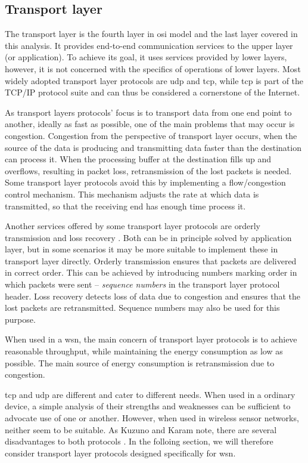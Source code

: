 \subsection{Transport layer}
The transport layer is the fourth layer in \acrshort{osi} model and the last layer covered in this analysis. It provides end-to-end communication services to the upper layer (or application)\cite{Braden1989RequirementsLayers}. To achieve its goal, it uses services provided by lower layers, however, it is not concerned with the specifics of operations of lower layers. Most widely adopted transport layer protocols are \acrshort{udp} and \acrshort{tcp}, while \acrshort{tcp} is part of the TCP/IP protocol suite and can thus be considered a cornerstone of the Internet.

As transport layers protocols' focus is to transport data from one end point to another, ideally as fast as possible, one of the main problems that may occur is congestion. Congestion from the perspective of transport layer occurs, when the source of the data is producing and transmitting data faster than the destination can process it. When the processing buffer at the destination fills up and overflows, resulting in packet loss, retransmission of the lost packets is needed. Some transport layer protocols avoid this by implementing a flow/congestion control mechanism. This mechanism adjusts the rate at which data is transmitted, so that the receiving end has enough time process it.

Another services offered by some transport layer protocols are orderly transmission and loss recovery \cite{Kuzuno2017BlockchainBitcoin}. Both can be in principle solved by application layer, but in some scenarios it may be more suitable to implement these in transport layer directly. Orderly transmission ensures that packets are delivered in correct order. This can be achieved by introducing numbers marking order in which packets were sent -- \textit{sequence numbers} in the transport layer protocol header. Loss recovery detects loss of data due to congestion and ensures that the lost packets are retransmitted. Sequence numbers may also be used for this purpose.

When used in a \acrshort{wsn}, the main concern of transport layer protocols is to achieve reasonable throughput, while maintaining the energy consumption as low as possible. The main source of energy consumption is retransmission due to congestion.

\acrshort{tcp} and \acrshort{udp} are different and cater to different needs. When used in a ordinary device, a simple analysis of their strengths and weaknesses can be sufficient to advocate use of one or another. However, when used in wireless sensor networks, neither seem to be suitable. As Kuzuno and Karam note, there are several disadvantages to both protocols \cite{Kuzuno2017BlockchainBitcoin}. In the folloing section, we will therefore consider transport layer protocols designed specifically for \acrshort{wsn}.